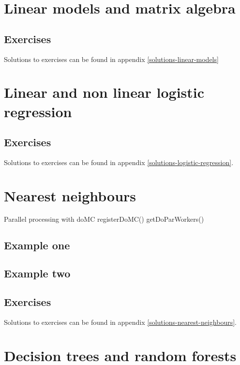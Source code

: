 \documentclass[]{book}
\theoremstyle{definition}
\theoremstyle{definition}
\theoremstyle{definition}
\theoremstyle{remark}
\begin{document}
\chapter{Linear models and matrix algebra}\label{linear-models}

\section{Exercises}\label{exercises}

Solutions to exercises can be found in appendix
\ref{solutions-linear-models}

\chapter{Linear and non linear logistic
regression}\label{logistic-regression}

\section{Exercises}\label{exercises-1}

Solutions to exercises can be found in appendix
\ref{solutions-logistic-regression}.

\chapter{Nearest neighbours}\label{nearest-neighbours}

Parallel processing with doMC registerDoMC() getDoParWorkers()

\section{Example one}\label{example-one}

\section{Example two}\label{example-two}

\section{Exercises}\label{exercises-2}

Solutions to exercises can be found in appendix
\ref{solutions-nearest-neighbours}.

\chapter{Decision trees and random forests}\label{decision-trees}
\end{document}
